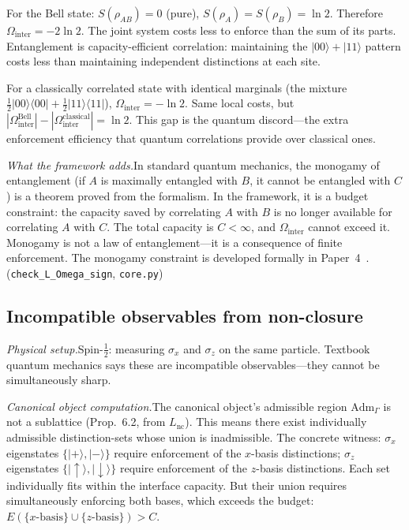 \documentclass[11pt]{article}
\newcommand{\Adm}{\mathrm{Adm}}
\begin{document}
For the Bell state: $S(\rho_{AB}) = 0$ (pure), $S(\rho_A) = S(\rho_B) = \ln 2$.  Therefore $\Omega_{\mathrm{inter}} = -2\ln 2$.  The joint system costs less to enforce than the sum of its parts.  Entanglement is capacity-efficient correlation: maintaining the $|00\rangle + |11\rangle$ pattern costs less than maintaining independent distinctions at each site.

For a classically correlated state with identical marginals (the mixture $\tfrac{1}{2}|00\rangle\!\langle 00| + \tfrac{1}{2}|11\rangle\!\langle 11|$), $\Omega_{\mathrm{inter}} = -\ln 2$.  Same local costs, but $|\Omega_{\mathrm{inter}}^{\text{Bell}}| - |\Omega_{\mathrm{inter}}^{\text{classical}}| = \ln 2$.  This gap is the quantum discord---the extra enforcement efficiency that quantum correlations provide over classical ones.

\textit{What the framework adds.}\quad In standard quantum mechanics, the monogamy of entanglement (if $A$ is maximally entangled with $B$, it cannot be entangled with $C$) is a theorem proved from the formalism.  In the framework, it is a budget constraint: the capacity saved by correlating $A$ with $B$ is no longer available for correlating $A$ with $C$.  The total capacity is $C < \infty$, and $\Omega_{\mathrm{inter}}$ cannot exceed it.  Monogamy is not a law of entanglement---it is a consequence of finite enforcement.  The monogamy constraint is developed formally in Paper~4~\cite{P4}.  (\texttt{check\_L\_Omega\_sign}, \texttt{core.py})


\subsection{Incompatible observables from non-closure}

\textit{Physical setup.}\quad Spin-$\tfrac{1}{2}$: measuring $\sigma_x$ and $\sigma_z$ on the same particle.  Textbook quantum mechanics says these are incompatible observables---they cannot be simultaneously sharp.

\textit{Canonical object computation.}\quad The canonical object's admissible region $\Adm_\Gamma$ is not a sublattice (Prop.~6.2, from $L_{\mathrm{nc}}$).  This means there exist individually admissible distinction-sets whose union is inadmissible.  The concrete witness: $\sigma_x$ eigenstates $\{|+\rangle, |-\rangle\}$ require enforcement of the $x$-basis distinctions; $\sigma_z$ eigenstates $\{|\!\uparrow\rangle, |\!\downarrow\rangle\}$ require enforcement of the $z$-basis distinctions.  Each set individually fits within the interface capacity.  But their union requires simultaneously enforcing both bases, which exceeds the budget: $E(\{x\text{-basis}\} \cup \{z\text{-basis}\}) > C$.
\end{document}
